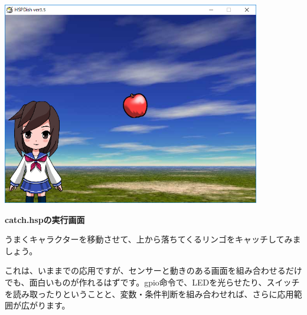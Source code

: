 \documentclass[a4paper,dvipdfmx]{jarticle}
\begin{document}
\begin{center}
\includegraphics[width=11.269cm,height=8.89cm]{text04-img/text04-img041.png}

\end{center}

\bigskip


\bigskip


\bigskip


\bigskip


\bigskip


\bigskip


\bigskip


\bigskip


\bigskip


\bigskip


\bigskip


\bigskip


\bigskip


\bigskip


\bigskip


\bigskip

{\bfseries
catch.hspの実行画面}


\bigskip


\bigskip


\bigskip


\bigskip


\bigskip

うまくキャラクターを移動させて、上から落ちてくるリンゴをキャッチしてみましょう。


\bigskip

これは、いままでの応用ですが、センサーと動きのある画面を組み合わせるだけでも、面白いものが作れるはずです。gpio命令で、LEDを光らせたり、スイッチを読み取ったりということと、変数・条件判断を組み合わせれば、さらに応用範囲が広がります。
\end{document}
